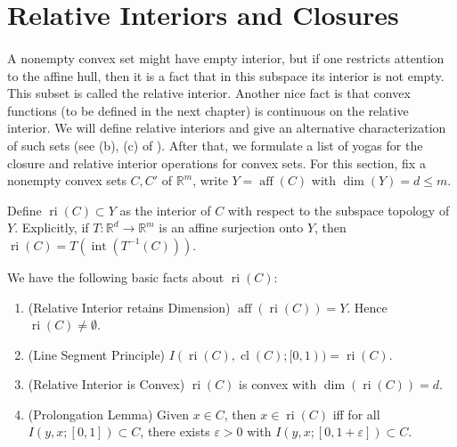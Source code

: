 \section{Relative Interiors and Closures}
\label{sect:012}

\paragraph{}A nonempty convex set might have empty interior, but if one restricts attention to the affine hull, then it is a fact that in this subspace its interior is not empty. This subset is called the relative interior. Another nice fact is that convex functions (to be defined in the next chapter) is continuous on the relative interior. We will define relative interiors and give an alternative characterization of such sets (see (b), (c) of ). After that, we formulate a list of yogas for the closure and relative interior operations for convex sets. For this section, fix a nonempty convex sets $C,C'$ of $\mathbb{R}^m$, write $Y=\operatorname{aff}(C)$ with $\dim(Y)=d\leq m$.

\begin{defn}
	\label{defn:012-relint}
	Define $\operatorname{ri}(C)\subset Y$ as the interior of $C$ with respect to the subspace topology of $Y$. Explicitly, if $T:\mathbb{R}^d\to \mathbb{R}^m$ is an affine surjection onto $Y$, then $\operatorname{ri}(C)=T (\operatorname{int}(T^{-1}(C)))$.
\end{defn}

\begin{prop}We have the following basic facts about $\operatorname{ri}(C)$:
	\label{prop:012-basic-ri}
	\begin{enumerate}[label=(\alph*)]
		\item (Relative Interior retains Dimension) $\operatorname{aff}(\operatorname{ri}(C))=Y$. Hence $\operatorname{ri}(C)\neq\emptyset$.
		\item (Line Segment Principle) $I(\operatorname{ri}(C),\operatorname{cl}(C);[0,1))=\operatorname{ri}(C)$.
		\item (Relative Interior is Convex) $\operatorname{ri}(C)$ is convex with $\operatorname{dim}(\operatorname{ri}(C))=d$.
		\item (Prolongation Lemma) Given $x\in C$, then $x\in \operatorname{ri}(C)$ iff for all $I(y,x;[0,1])\subset C$, there exists $\varepsilon>0$ with $I(y,x;[0,1+\varepsilon ])\subset C$.
	\end{enumerate}
\end{prop}


